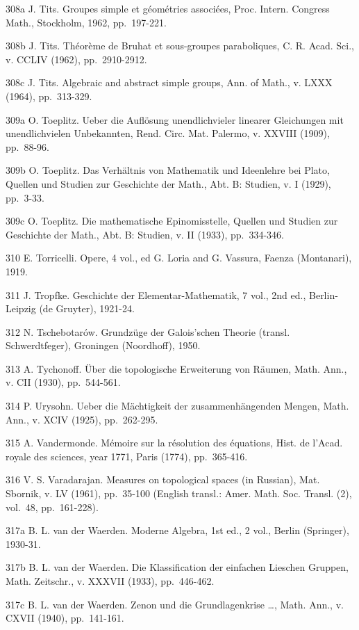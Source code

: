 308a J. Tits. Groupes simple et géométries associées, Proc. Intern. Congress Math., Stockholm, 1962, pp.~197-221.

308b J. Tits. Théorème de Bruhat et sous-groupes paraboliques, C. R. Acad. Sci., v. CCLIV (1962), pp.~2910-2912.

308c J. Tits. Algebraic and abstract simple groups, Ann. of Math., v. LXXX (1964), pp.~313-329.

309a O. Toeplitz. Ueber die Auflösung unendlichvieler linearer Gleichungen mit unendlichvielen Unbekannten, Rend. Circ. Mat. Palermo, v. XXVIII (1909), pp.~88-96.

309b O. Toeplitz. Das Verhältnis von Mathematik und Ideenlehre bei Plato, Quellen und Studien zur Geschichte der Math., Abt. B: Studien, v. I (1929), pp.~3-33.

309c O. Toeplitz. Die mathematische Epinomisstelle, Quellen und Studien zur Geschichte der Math., Abt. B: Studien, v. II (1933), pp.~334-346.

310 E. Torricelli. Opere, 4 vol., ed G. Loria and G. Vassura, Faenza (Montanari), 1919.

311 J. Tropfke. Geschichte der Elementar-Mathematik, 7 vol., 2nd ed., Berlin-Leipzig (de Gruyter), 1921-24.

312 N. Tschebotarów. Grundzüge der Galois'schen Theorie (transl. Schwerdtfeger), Groningen (Noordhoff), 1950.

313 A. Tychonoff. Über die topologische Erweiterung von Räumen, Math. Ann., v. CII (1930), pp.~544-561.

314 P. Urysohn. Ueber die Mächtigkeit der zusammenhängenden Mengen, Math. Ann., v. XCIV (1925), pp.~262-295.

315 A. Vandermonde. Mémoire sur la résolution des équations, Hist. de l'Acad. royale des sciences, year 1771, Paris (1774), pp.~365-416.

316 V. S. Varadarajan. Measures on topological spaces (in Russian), Mat. Sbornik, v. LV (1961), pp.~35-100 (English transl.: Amer. Math. Soc. Transl. (2), vol.~48, pp.~161-228).

317a B. L. van der Waerden. Moderne Algebra, 1st ed., 2 vol., Berlin (Springer), 1930-31.

317b B. L. van der Waerden. Die Klassification der einfachen Lieschen Gruppen, Math. Zeitschr., v. XXXVII (1933), pp.~446-462.

317c B. L. van der Waerden. Zenon und die Grundlagenkrise \ldots, Math. Ann., v. CXVII (1940), pp.~141-161.


